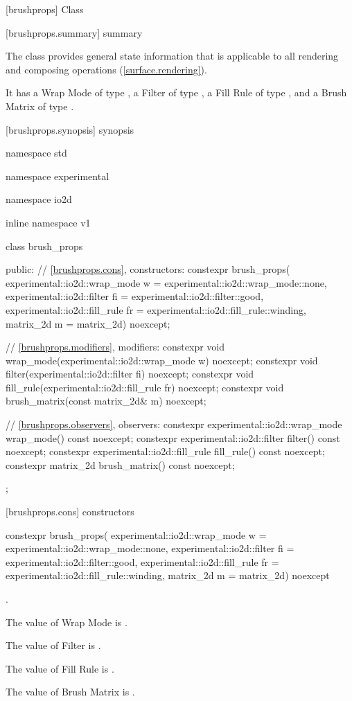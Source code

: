 
 [brushprops] {Class }

 [brushprops.summary] { summary}

\pnum
The  class provides general state information that is applicable to all rendering and composing operations (\ref{surface.rendering}).

\pnum
It has a Wrap Mode of type , a Filter of type , a Fill Rule of type , and a Brush Matrix of type .

 [brushprops.synopsis] { synopsis}

\begin{codeblock}
namespace std { namespace experimental { namespace io2d { inline namespace v1 {
  class brush_props {
  public:
    // \ref{brushprops.cons}, constructors:
    constexpr brush_props(
      experimental::io2d::wrap_mode w = experimental::io2d::wrap_mode::none,
      experimental::io2d::filter fi = experimental::io2d::filter::good,
      experimental::io2d::fill_rule fr = experimental::io2d::fill_rule::winding,
      matrix_2d m = matrix_2d{}) noexcept;

    // \ref{brushprops.modifiers}, modifiers:
    constexpr void wrap_mode(experimental::io2d::wrap_mode w) noexcept;
    constexpr void filter(experimental::io2d::filter fi) noexcept;
    constexpr void fill_rule(experimental::io2d::fill_rule fr) noexcept;
    constexpr void brush_matrix(const matrix_2d& m) noexcept;

    // \ref{brushprops.observers}, observers:
    constexpr experimental::io2d::wrap_mode wrap_mode() const noexcept;
    constexpr experimental::io2d::filter filter() const noexcept;
    constexpr experimental::io2d::fill_rule fill_rule() const noexcept;
    constexpr matrix_2d brush_matrix() const noexcept;
  };
}}}}
\end{codeblock}

 [brushprops.cons] { constructors}

\begin{itemdecl}
constexpr brush_props(
  experimental::io2d::wrap_mode w = experimental::io2d::wrap_mode::none,
  experimental::io2d::filter fi = experimental::io2d::filter::good,
  experimental::io2d::fill_rule fr = experimental::io2d::fill_rule::winding,
  matrix_2d m = matrix_2d{}) noexcept    
\end{itemdecl}
\begin{itemdescr}
\onecolumn
\preconditions
{}.

\pnum
\effects
The value of Wrap Mode is .

\pnum
The value of Filter is .

\pnum
The value of Fill Rule is .

\pnum
The value of Brush Matrix is .
\end{itemdescr}

